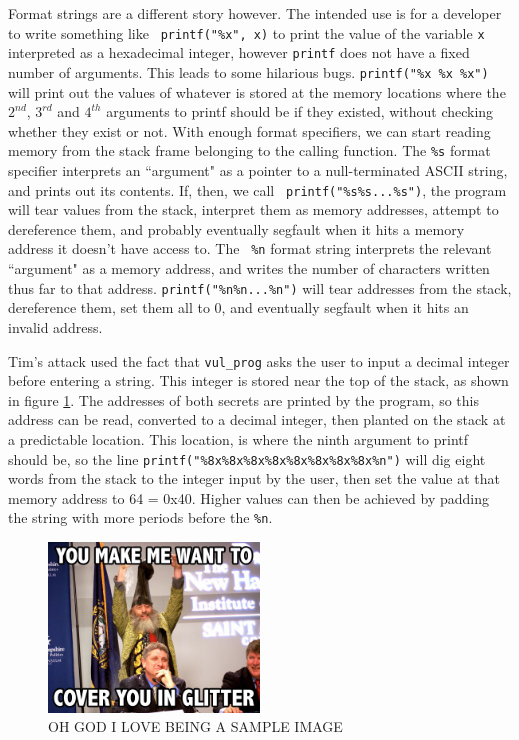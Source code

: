 Format strings are a different story however. The intended use is for a developer to write something like {\tt
printf("\%x", x)} to print the value of the variable {\tt x} interpreted as a hexadecimal integer, however {\tt printf}
does not have a fixed number of arguments. This leads to some hilarious bugs. {\tt printf("\%x \%x \%x")} will print out
the values of whatever is stored at the memory locations where the $2^{nd}$, $3^{rd}$ and $4^{th}$ arguments to printf
should be if they existed, without checking whether they exist or not. With enough format specifiers, we can start
reading memory from the stack frame belonging to the calling function. The {\tt \%s} format specifier interprets an
``argument" as a pointer to a null-terminated ASCII string, and prints out its contents. If, then, we call {\tt
printf("\%s\%s...\%s")}, the program will tear values from the stack, interpret them as memory addresses, attempt to
dereference them, and probably eventually segfault when it hits a memory address it doesn't have access to. The {\tt
\%n} format string interprets the relevant ``argument" as a memory address, and writes the number of characters written
thus far to that address. {\tt printf("\%n\%n...\%n")} will tear addresses from the stack, dereference them, set them
all to 0, and eventually segfault when it hits an invalid address.

Tim's attack used the fact that {\tt vul\_prog} asks the user to input a decimal integer before entering a string. This integer is stored near the top of the stack, as shown in figure \ref{fig_vul_prog_stack}. The addresses of both secrets are printed by the program, so this address can be read, converted to a decimal integer, then planted on the stack at a predictable location. This location, is where the ninth argument to printf should be, so the line {\tt printf("\%8x\%8x\%8x\%8x\%8x\%8x\%8x\%8x\%n")} will dig eight words from the stack to the integer input by the user, then set the value at that memory address to 64 = 0x40. Higher values can then be achieved by padding the string with more periods before the {\tt \%n}.


\begin{figure}[h]
    \centering
    \includegraphics[width = 0.5\textwidth]{./images/placeholder.jpg}
    \caption{OH GOD I LOVE BEING A SAMPLE IMAGE}
    \label{fig_vul_prog_stack}
\end{figure}


